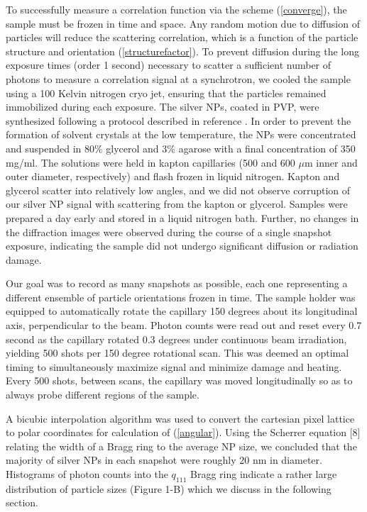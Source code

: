 \documentclass [11pt,fleqn]{article}
\begin{document}
To successfully measure a correlation function via the scheme (\ref{converge}), the sample must be frozen in time and space. Any random motion due to diffusion of particles will reduce the scattering correlation, which is a function of the particle structure and orientation (\ref{structurefactor}). To prevent diffusion during the long exposure times (order 1 second) necessary to scatter a sufficient number of photons to measure a correlation signal at a synchrotron, we cooled the sample using a 100 Kelvin nitrogen cryo jet, ensuring that the particles remained immobilized during each exposure. The silver NPs, coated in PVP, were synthesized following a protocol described in reference \cite{Levard:2011bx}. In order to prevent the formation of solvent crystals at the low temperature, the NPs were concentrated and suspended in 80\% glycerol and 3\% agarose with a final concentration of 350 mg/ml. The solutions were held in kapton capillaries (500 and 600 $\mu$m inner and outer diameter, respectively) and flash frozen in liquid nitrogen. Kapton and glycerol scatter into relatively low angles, and we did not observe corruption of our silver NP signal with scattering from the kapton or glycerol. Samples were prepared a day early and stored in a liquid nitrogen bath. Further, no changes in the diffraction images were observed during the course of a single snapshot exposure, indicating the sample did not undergo significant diffusion or radiation damage.

Our goal was to record as many snapshots as possible, each one representing a different ensemble of particle orientations frozen in time. The sample holder was equipped to automatically rotate the capillary 150 degrees about its longitudinal axis, perpendicular to the beam. Photon counts were read out and reset every 0.7 second as the capillary rotated 0.3 degrees under continuous beam irradiation, yielding 500 shots per 150 degree rotational scan. This was deemed an optimal timing to simultaneously maximize signal and minimize damage and heating. Every 500 shots, between scans, the capillary was moved longitudinally so as to always probe different regions of the sample.

A bicubic interpolation algorithm was used to convert the cartesian pixel lattice to polar coordinates for calculation of (\ref{angular}). Using the Scherrer equation [8] relating the width of a Bragg ring to the average NP size, we concluded that the majority of silver NPs in each snapshot were roughly 20 nm in diameter. Histograms of photon counts into the $q_{111}$ Bragg ring indicate a rather large distribution of particle sizes (Figure 1-B) which we discuss in the following section.
\end{document}
